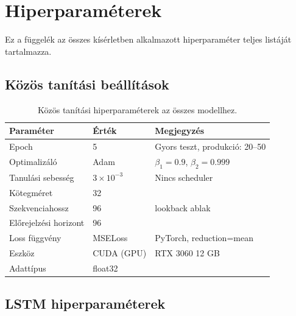 \chapter{Hiperparaméterek}
\label{app:hyperparams}

Ez a függelék az összes kísérletben alkalmazott hiperparaméter teljes listáját
tartalmazza.

\section{Közös tanítási beállítások}

\begin{table}[H]
    \centering
    \begin{tabular}{|l|l|l|}
        \hline
        \textbf{Paraméter} & \textbf{Érték} & \textbf{Megjegyzés} \\
        \hline\hline
        Epoch                  & 5          & Gyors teszt, produkció: 20–50 \\
        Optimalizáló           & Adam       & $\beta_1=0.9$, $\beta_2=0.999$ \\
        Tanulási sebesség      & $3 \times 10^{-3}$ & Nincs scheduler \\
        Kötegméret             & 32         & \\
        Szekvenciahossz        & 96         & lookback ablak \\
        Előrejelzési horizont  & 96         & \\
        Loss függvény          & MSELoss    & PyTorch, reduction=mean \\
        Eszköz                 & CUDA (GPU) & RTX 3060 12 GB \\
        Adattípus              & float32    & \\
        \hline
    \end{tabular}
    \caption{Közös tanítási hiperparaméterek az összes modellhez.}
    \label{tab:app_train}
\end{table}

\section{LSTM hiperparaméterek}

